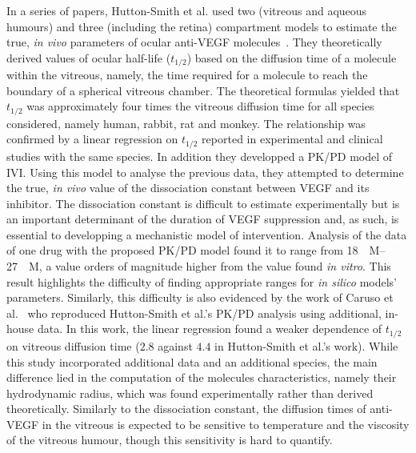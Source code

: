 \documentclass{article}
\begin{document}
In a series of papers, Hutton-Smith et al. used two (vitreous and aqueous humours) and three (including the retina) compartment models to estimate the true, \textit{in vivo} parameters of ocular anti-VEGF molecules~\cite{HuttonSmith_2016,HuttonSmith_2017,HuttonSmith_2018}.
They theoretically derived values of ocular half-life ($t_{1/2}$) based on the diffusion time of a molecule within the vitreous, namely, the time required for a molecule to reach the boundary of a spherical vitreous chamber.
The theoretical formulas yielded that $t_{1/2}$ was approximately four times the vitreous diffusion time for all species considered, namely human, rabbit, rat and monkey.
The relationship was confirmed by a linear regression on $t_{1/2}$ reported in experimental and clinical studies with the same species.
In addition they developped a PK/PD model of IVI.
Using this model to analyse the previous data, they attempted to determine the true, \textit{in vivo} value of the dissociation constant between VEGF and its inhibitor.
The dissociation constant is difficult to estimate experimentally but is an important determinant of the duration of VEGF suppression\cite{HuttonSmith_2016} and, as such, is essential to developping a mechanistic model of intervention.
Analysis of the data of one drug with the proposed PK/PD model found it to range from \SIrange[range-phrase={ {to} }]{18}{27}{\nano\textsc{M}}, a value orders of magnitude higher from the value found \textit{in vitro}.
This result highlights the difficulty of finding appropriate ranges for \textit{in silico} models' parameters.
Similarly, this difficulty is also evidenced by the work of Caruso et al.~\cite{Caruso_2020} who reproduced Hutton-Smith et al.'s PK/PD analysis using additional, in-house data.
In this work, the linear regression found a weaker dependence of $t_{1/2}$ on vitreous diffusion time ($2.8$ against $4.4$ in Hutton-Smith et al.'s work).
While this study incorporated additional data and an additional species, the main difference lied in the computation of the molecules characteristics, namely their hydrodynamic radius, which was found experimentally rather than derived theoretically.
Similarly to the dissociation constant, the diffusion times of anti-VEGF in the vitreous is expected to be sensitive to temperature and the viscosity of the vitreous humour, though this sensitivity is hard to quantify.

\end{document}
